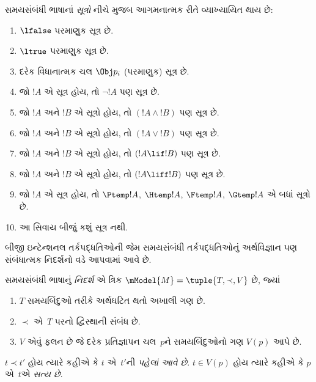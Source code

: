 \begin{defn}
સમયસંબંધી ભાષાનાં \emph{સૂત્રો} નીચે મુજબ આગમનાત્મક રીતે
  વ્યાખ્યાયિત થાય છે:
\begin{enumerate}
\item $\lfalse$ પરમાણુક સૂત્ર છે.

\item $\ltrue$ પરમાણુક સૂત્ર છે.

\item દરેક વિધાનાત્મક ચલ $\Obj p_i$ (પરમાણુક) સૂત્ર છે.

\item જો $!A$ એ સૂત્ર હોય, તો $\lnot !A$ પણ
  સૂત્ર છે.

\item જો $!A$ અને $!B$ એ સૂત્રો હોય, તો $(!A \land
  !B)$ પણ સૂત્ર છે.

\item જો $!A$ અને $!B$ એ સૂત્રો હોય, તો $(!A \lor !B)$
  પણ સૂત્ર છે.

\item જો $!A$ અને $!B$ એ સૂત્રો હોય, તો $(!A \lif !B)$
  પણ સૂત્ર છે.

\item જો $!A$ અને $!B$ એ સૂત્રો હોય, તો $(!A \liff !B)$
  પણ સૂત્ર છે.

\item જો $!A$ એ સૂત્ર હોય, તો $\Ptemp  !A$, $\Htemp  !A$, $\Ftemp !A$, $\Gtemp  !A$
  એ બધાં સૂત્રો છે.

\item આ સિવાય બીજું કશું સૂત્ર નથી.
\end{enumerate}
\end{defn}

બીજી ઇન્ટેન્શનલ તર્કપદ્ધતિઓની જેમ સમયસંબંધી તર્કપદ્ધતિઓનું
અર્થવિજ્ઞાન પણ સંબંધાત્મક નિદર્શનો વડે આપવામાં આવે છે.

\begin{defn}
  સમયસંબંધી ભાષાનું \emph{નિદર્શ} એ ત્રિક
  $\mModel{M} = \tuple{T, \prec, V}$ છે, જ્યાં
  \begin{enumerate}
  \item $T$ સમયબિંદુઓ તરીકે અર્થઘટિત થતો અખાલી ગણ છે.
  \item $\prec$ એ~$T$ પરનો દ્વિસ્થાની સંબંધ છે.
  \item $V$ એવું ફલન છે જે દરેક પ્રતિજ્ઞાપન ચલ~$p$ને સમયબિંદુઓનો ગણ $V(p)$ આપે છે.
  \end{enumerate}
  $t \prec t'$ હોય ત્યારે કહીએ કે $t$ એ~$t'$ની \emph{પહેલાં આવે છે}.
  $t \in V(p)$ હોય ત્યારે કહીએ કે $p$ એ~$t$એ \emph{સત્ય છે}.
\end{defn}

